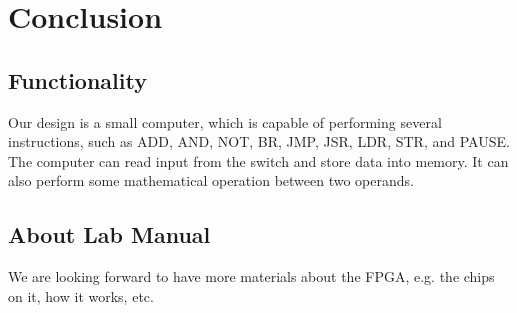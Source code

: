 \documentclass[12pt]{article}
\begin{document}
\section{Conclusion}
\subsection{Functionality}
Our design is a small computer, which is capable of performing several instructions, such as ADD, AND, NOT, BR, JMP, JSR, LDR, STR, and PAUSE. The computer can read input from the switch and store data into memory. It can also perform some mathematical operation between two operands. 
\subsection{About Lab Manual}
We are looking forward to have more materials about the FPGA, e.g. the chips on it, how it works, etc.

\newpage


\end{document}
